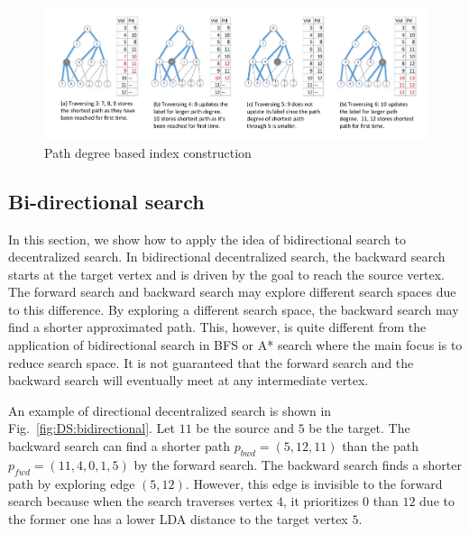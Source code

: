 \begin{figure}[ht]
		\vspace{-1cm}
    \centering
    \includegraphics[width=\linewidth]{./figures/new_illustrate/bfs_illustrate.pdf}
		\vspace{-1cm}
    \caption{Path degree based index construction}
    \label{fig:bfs_illustrate}
		\vspace{-5mm}
\end{figure}

\subsection{Bi-directional search}

In this section, we show how to apply the idea of bidirectional search to decentralized search. In bidirectional decentralized search, the backward search starts at the target vertex and is driven by the goal to reach the source vertex. The forward search and backward search may explore different search spaces due to this difference. By exploring a different search space, the backward search may find a shorter approximated path. This, however, is quite different from the application of bidirectional search in BFS or A* search where the main focus is to reduce search space. It is not guaranteed that the forward search and the backward search will eventually meet at any intermediate vertex. 

An example of directional decentralized search is shown in Fig.~\ref{fig:DS:bidirectional}. Let $11$ be the source and $5$ be the target. The backward search can find a shorter path $p_{bwd} = (5, 12, 11)$ than the path $p_{fwd} = (11, 4, 0, 1, 5)$ by the forward search. The backward search finds a shorter path by exploring edge $(5, 12)$. However, this edge is invisible to the forward search because when the search traverses vertex $4$, it prioritizes $0$ than $12$ due to the former one has a lower LDA distance to the target vertex $5$.


